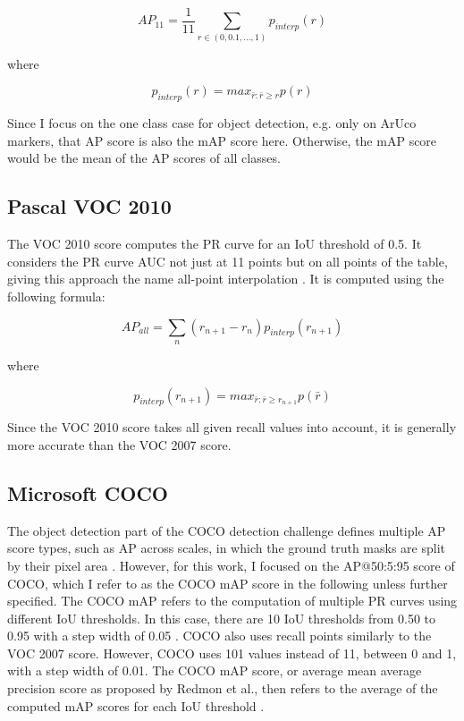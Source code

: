 \documentclass[10pt]{book}
\begin{document}
$$AP_{11} = \frac{1}{11} \sum_{r\in(0,0.1,...,1)}p_{interp}(r)$$

where

$$p_{interp}(r) = max_{\bar{r} : \bar{r} \geq r}p(r)$$


Since I focus on the one class case for object detection, e.g. only on ArUco markers, that AP score is also the \ac{mAP} score here. Otherwise, the \ac{mAP} score would be the mean of the AP scores of all classes.

\subsection{Pascal VOC 2010}

The VOC 2010 score computes the \ac{PR curve} for an \ac{IoU} threshold of 0.5. It considers the \ac{PR curve} \ac{AUC} not just at 11 points but on all points of the table, giving this approach the name all-point interpolation \cite{padilla2020survey}. It is computed using the following formula:

$$AP_{all} = \sum_{n}(r_{n+1} - r_n)p_{interp}(r_{n+1})$$

where

$$p_{interp}(r_{n + 1}) = max_{\bar{r} : \bar{r} \geq r_{n+1}}p(\bar{r})$$

Since the VOC 2010 score takes all given recall values into account, it is generally more accurate than the VOC 2007 score.

\subsection{Microsoft COCO}

The object detection part of the \ac{COCO} detection challenge defines multiple AP score types, such as AP across scales, in which the ground truth masks are split by their pixel area \cite{padilla2020survey}. However, for this work, I focused on the AP@50:5:95 score of \ac{COCO}, which I refer to as the \ac{COCO} \ac{mAP} score in the following unless further specified. The \ac{COCO} \ac{mAP} refers to the computation of multiple \acp{PR curve} using different \ac{IoU} thresholds. In this case, there are 10 \ac{IoU} thresholds from 0.50 to 0.95 with a step width of 0.05 \cite{terven2023comprehensive}. \ac{COCO} also uses recall points similarly to the VOC 2007 score. However, \ac{COCO} uses 101 values instead of 11, between 0 and 1, with a step width of 0.01. %
The \ac{COCO} \ac{mAP} score, or average mean average precision score as proposed by Redmon et al., then refers to the average of the computed \ac{mAP} scores for each \ac{IoU} threshold \cite{redmon2018yolov3}. 
\end{document}
